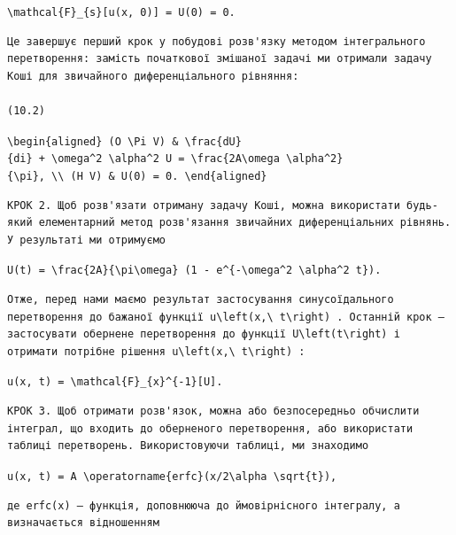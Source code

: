 \documentclass[
  ukrainian,
]{article}
\begin{document}
\texttt{\textbackslash{}mathcal\{F\}\_\{s\}{[}u(x,\ 0){]}\ =\ U(0)\ =\ 0.}

\begin{verbatim}
Це завершує перший крок у побудові розв'язку методом інтегрального перетворення: замість початкової змішаної задачі ми отримали задачу Коші для звичайного диференціального рівняння:

(10.2)
\end{verbatim}

\texttt{\textbackslash{}begin\{aligned\}\ (O\ \textbackslash{}Pi\ V)\ \&\ \textbackslash{}frac\{dU\}\{di\}\ +\ \textbackslash{}omega\^{}2\ \textbackslash{}alpha\^{}2\ U\ =\ \textbackslash{}frac\{2A\textbackslash{}omega\ \textbackslash{}alpha\^{}2\}\{\textbackslash{}pi\},\ \textbackslash{}\textbackslash{}\ (H\ V)\ \&\ U(0)\ =\ 0.\ \textbackslash{}end\{aligned\}}

\begin{verbatim}
КРОК 2. Щоб розв'язати отриману задачу Коші, можна використати будь-який елементарний метод розв'язання звичайних диференціальних рівнянь. У результаті ми отримуємо
\end{verbatim}

\texttt{U(t)\ =\ \textbackslash{}frac\{2A\}\{\textbackslash{}pi\textbackslash{}omega\}\ (1\ -\ e\^{}\{-\textbackslash{}omega\^{}2\ \textbackslash{}alpha\^{}2\ t\}).}

\begin{verbatim}
Отже, перед нами маємо результат застосування синусоїдального перетворення до бажаної функції u\left(x,\ t\right) . Останній крок — застосувати обернене перетворення до функції U\left(t\right) і отримати потрібне рішення u\left(x,\ t\right) :
\end{verbatim}

\texttt{u(x,\ t)\ =\ \textbackslash{}mathcal\{F\}\_\{x\}\^{}\{-1\}{[}U{]}.}

\begin{verbatim}
КРОК 3. Щоб отримати розв'язок, можна або безпосередньо обчислити інтеграл, що входить до оберненого перетворення, або використати таблиці перетворень. Використовуючи таблиці, ми знаходимо
\end{verbatim}

\texttt{u(x,\ t)\ =\ A\ \textbackslash{}operatorname\{erfc\}(x/2\textbackslash{}alpha\ \textbackslash{}sqrt\{t\}),}

\begin{verbatim}
де erfc(x) — функція, доповнююча до ймовірнісного інтегралу, а визначається відношенням
\end{verbatim}
\end{document}
